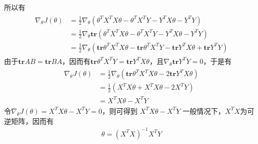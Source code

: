 所以有
\begin{eqnarray}
\begin{aligned}
\nabla_\theta J(\theta)
 &=\frac{1}{2}\nabla_\theta(\theta^TX^TX\theta-\theta^TX^TY-Y^TX\theta-Y^TY)\\
&=\frac{1}{2}\nabla_\theta\textbf{tr}(\theta^TX^TX\theta-\theta^TX^TY-Y^TX\theta-Y^TY)\\
&=\frac{1}{2}\nabla_\theta(\textbf{tr}\theta^TX^TX\theta-\textbf{tr}\theta^TX^TY-\textbf{tr}Y^TX\theta+\textbf{tr}Y^TY)
\end{aligned}
\end{eqnarray}
由于$\textbf{tr}AB=\textbf{tr}BA$，因而有$\textbf{tr}\theta^TX^TY=\textbf{tr}Y^TX\theta$，且$\nabla_\theta\textbf{tr}Y^TY=0$，于是有
\begin{eqnarray}
\begin{aligned}
\nabla_\theta J(\theta)&=\frac{1}{2}\nabla_\theta(\textbf{tr}\theta^TX^TX\theta-2\textbf{tr}Y^TX\theta)\\
&=\frac{1}{2}(X^TX\theta+X^TX\theta-2X^TY)\\
&=X^TX\theta-X^TY
\end{aligned}
\end{eqnarray}
令$\nabla_\theta J(\theta)=X^TX\theta-X^TY=0$，则可得到
$X^TX\theta-X^TY$
一般情况下，$X^TX$为可逆矩阵，因而有
\begin{eqnarray}
\theta=(X^TX)^{-1}X^TY
\end{eqnarray}